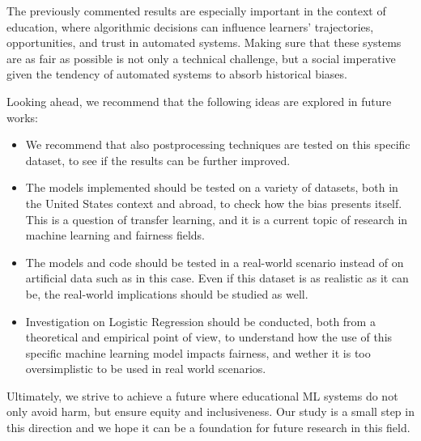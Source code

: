 \documentclass{article}
\begin{document}
The previously commented results are especially important in the context of education, where algorithmic decisions can influence learners' trajectories, opportunities, and trust in automated systems. Making sure that these systems are as fair as possible is not only a technical challenge, but a social imperative given the tendency of automated systems to absorb historical biases. 

Looking ahead, we recommend that the following ideas are explored in future works: 
\begin{itemize}
    \item We recommend that also postprocessing techniques are tested on this specific dataset, to see if the results can be further improved.
    \item The models implemented should be tested on a variety of datasets, both in the United States context and abroad, to check how the bias presents itself. This is a question of transfer learning, and it is a current topic of research in machine learning and fairness fields.
    \item The models and code should be tested in a real-world scenario instead of on artificial data such as in this case. Even if this dataset is as realistic as it can be, the real-world implications should be studied as well.
    \item Investigation on Logistic Regression should be conducted, both from a theoretical and empirical point of view, to understand how the use of this specific machine learning model impacts fairness, and wether it is too oversimplistic to be used in real world scenarios. 
\end{itemize}

Ultimately, we strive to achieve a future where educational ML systems do not only avoid harm, but ensure equity and inclusiveness. Our study is a small step in this direction and we hope it can be a foundation for future research in this field. 






\end{document}
